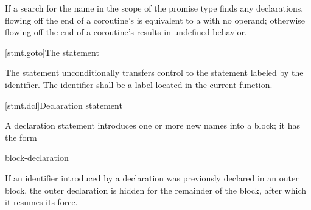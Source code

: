 \pnum
If a search for the name  in the scope of the promise type
finds any declarations,
flowing off the end of a coroutine's 
is equivalent to a  with no operand;
otherwise flowing off the end of a coroutine's 
results in undefined behavior.

[stmt.goto]{The  statement}%

\pnum
The  statement unconditionally transfers control to the
statement labeled by the identifier. The identifier shall be a
%
label located in the current function.

[stmt.dcl]{Declaration statement}%

\pnum
A declaration statement introduces one or more new names into a
block; it has the form
\begin{bnf}
\br
    block-declaration
\end{bnf}
\begin{note}
If an identifier introduced by a declaration was previously declared in
an outer block,
%
%
%
the outer declaration is hidden
for the remainder of the block,
after which it resumes its force.
\end{note}

